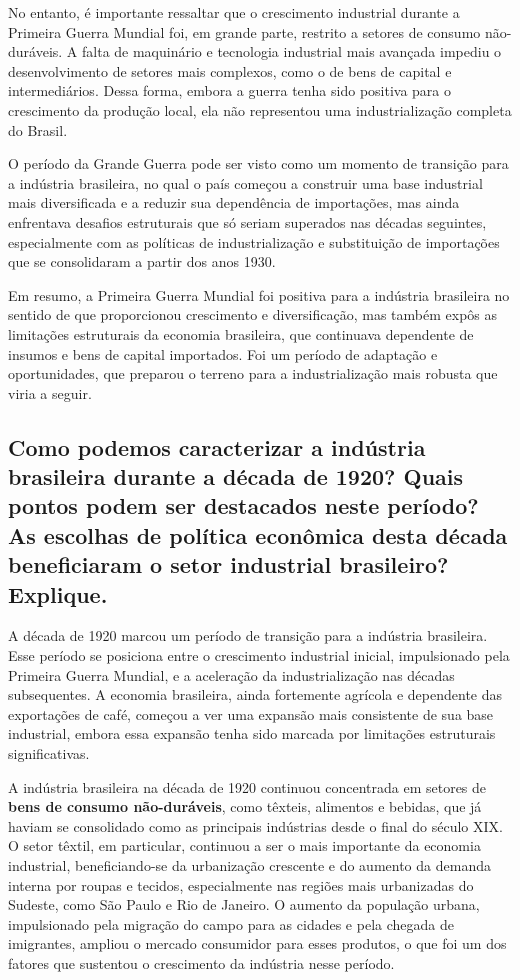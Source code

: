 \documentclass[a4paper,12pt]{article}[abntex2]
\begin{document}
No entanto, é importante ressaltar que o crescimento industrial durante a Primeira Guerra Mundial foi, em grande parte, restrito a setores de consumo não-duráveis. A falta de maquinário e tecnologia industrial mais avançada impediu o desenvolvimento de setores mais complexos, como o de bens de capital e intermediários. Dessa forma, embora a guerra tenha sido positiva para o crescimento da produção local, ela não representou uma industrialização completa do Brasil. 

O período da Grande Guerra pode ser visto como um momento de transição para a indústria brasileira, no qual o país começou a construir uma base industrial mais diversificada e a reduzir sua dependência de importações, mas ainda enfrentava desafios estruturais que só seriam superados nas décadas seguintes, especialmente com as políticas de industrialização e substituição de importações que se consolidaram a partir dos anos 1930.

Em resumo, a Primeira Guerra Mundial foi positiva para a indústria brasileira no sentido de que proporcionou crescimento e diversificação, mas também expôs as limitações estruturais da economia brasileira, que continuava dependente de insumos e bens de capital importados. Foi um período de adaptação e oportunidades, que preparou o terreno para a industrialização mais robusta que viria a seguir.

\subsection{\textbf{Como podemos caracterizar a indústria brasileira durante a década de 1920? Quais pontos podem ser destacados neste período? As escolhas de política econômica desta década beneficiaram o setor industrial brasileiro? Explique.}}

A década de 1920 marcou um período de transição para a indústria brasileira. Esse período se posiciona entre o crescimento industrial inicial, impulsionado pela Primeira Guerra Mundial, e a aceleração da industrialização nas décadas subsequentes. A economia brasileira, ainda fortemente agrícola e dependente das exportações de café, começou a ver uma expansão mais consistente de sua base industrial, embora essa expansão tenha sido marcada por limitações estruturais significativas.

A indústria brasileira na década de 1920 continuou concentrada em setores de \textbf{bens de consumo não-duráveis}, como têxteis, alimentos e bebidas, que já haviam se consolidado como as principais indústrias desde o final do século XIX. O setor têxtil, em particular, continuou a ser o mais importante da economia industrial, beneficiando-se da urbanização crescente e do aumento da demanda interna por roupas e tecidos, especialmente nas regiões mais urbanizadas do Sudeste, como São Paulo e Rio de Janeiro. O aumento da população urbana, impulsionado pela migração do campo para as cidades e pela chegada de imigrantes, ampliou o mercado consumidor para esses produtos, o que foi um dos fatores que sustentou o crescimento da indústria nesse período.
\end{document}
